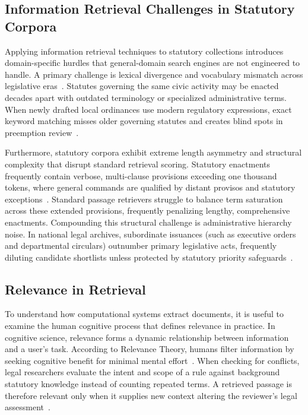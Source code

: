     \subsection{Information Retrieval Challenges in Statutory Corpora}
    Applying information retrieval techniques to statutory collections introduces domain-specific hurdles that general-domain search engines are not engineered to handle. A primary challenge is lexical divergence and vocabulary mismatch across legislative eras~\cite{blair1985an}. Statutes governing the same civic activity may be enacted decades apart with outdated terminology or specialized administrative terms. When newly drafted local ordinances use modern regulatory expressions, exact keyword matching misses older governing statutes and creates blind spots in preemption review~\cite{opijnen2017on}.

    Furthermore, statutory corpora exhibit extreme length asymmetry and structural complexity that disrupt standard retrieval scoring. Statutory enactments frequently contain verbose, multi-clause provisions exceeding one thousand tokens, where general commands are qualified by distant provisos and statutory exceptions~\cite{chalkidis2022lexglue}. Standard passage retrievers struggle to balance term saturation across these extended provisions, frequently penalizing lengthy, comprehensive enactments. Compounding this structural challenge is administrative hierarchy noise. In national legal archives, subordinate issuances (such as executive orders and departmental circulars) outnumber primary legislative acts, frequently diluting candidate shortlists unless protected by statutory priority safeguards~\cite{philgov1991ra7160}.

    \subsection{Relevance in Retrieval}
    To understand how computational systems extract documents, it is useful to examine the human cognitive process that defines relevance in practice. In cognitive science, relevance forms a dynamic relationship between information and a user's task. According to Relevance Theory, humans filter information by seeking cognitive benefit for minimal mental effort~\cite{sperber1996relevance}. When checking for conflicts, legal researchers evaluate the intent and scope of a rule against background statutory knowledge instead of counting repeated terms. A retrieved passage is therefore relevant only when it supplies new context altering the reviewer's legal assessment~\cite{saracevic2007relevance}.

